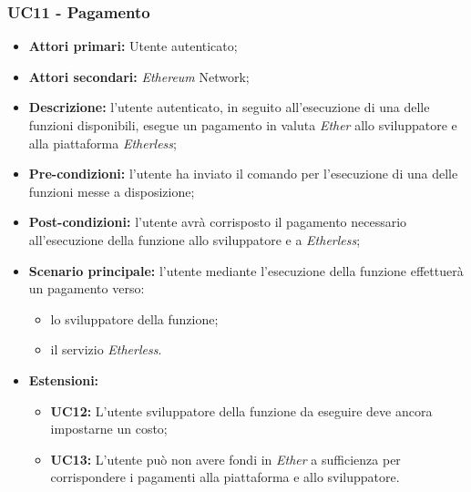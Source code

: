 \subsubsection{UC11 - Pagamento}
\begin{itemize}
	\item \textbf{Attori primari:} Utente autenticato;
	\item \textbf{Attori secondari:} \textit{Ethereum\glo} Network;
	\item \textbf{Descrizione:} l'utente autenticato, in seguito all'esecuzione di una delle funzioni disponibili, esegue un pagamento in valuta \textit{Ether\glo} allo sviluppatore e alla piattaforma \textit{Etherless}; 
	\item \textbf{Pre-condizioni:} l'utente ha inviato il comando per l'esecuzione di una delle funzioni messe a disposizione;
	\item \textbf{Post-condizioni:} l'utente avrà corrisposto il pagamento necessario all'esecuzione della funzione allo sviluppatore e a \textit{Etherless};
	\item \textbf{Scenario principale:} l'utente mediante l'esecuzione della funzione effettuerà un pagamento verso:
	\begin{itemize}
		\item lo sviluppatore della funzione;
		\item il servizio \textit{Etherless}.
	\end{itemize}
	\item \textbf{Estensioni:} 
	\begin{itemize}
		\item \textbf{UC12:} L'utente sviluppatore della funzione da eseguire deve ancora impostarne un costo;
		\item \textbf{UC13:} L'utente può non avere fondi in \textit{Ether\glo} a sufficienza per corrispondere i pagamenti alla piattaforma e allo sviluppatore.
	\end{itemize}
\end{itemize}